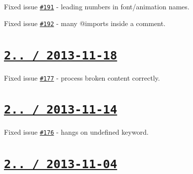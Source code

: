 \begin{DoxyItemize}
\item Fixed issue \href{https://github.com/jakubpawlowicz/clean-css/issues/191}{\tt \#191} -\/ leading numbers in {\ttfamily font}/{\ttfamily animation} names.
\item Fixed issue \href{https://github.com/jakubpawlowicz/clean-css/issues/192}{\tt \#192} -\/ many {\ttfamily @import}s inside a comment.
\end{DoxyItemize}

\section*{\href{https://github.com/jakubpawlowicz/clean-css/compare/v2.0.1...v2.0.2}{\tt 2.. / 2013-\/11-\/18} }


\begin{DoxyItemize}
\item Fixed issue \href{https://github.com/jakubpawlowicz/clean-css/issues/177}{\tt \#177} -\/ process broken content correctly.
\end{DoxyItemize}

\section*{\href{https://github.com/jakubpawlowicz/clean-css/compare/v2.0.0...v2.0.1}{\tt 2.. / 2013-\/11-\/14} }


\begin{DoxyItemize}
\item Fixed issue \href{https://github.com/jakubpawlowicz/clean-css/issues/176}{\tt \#176} -\/ hangs on {\ttfamily undefined} keyword.
\end{DoxyItemize}

\section*{\href{https://github.com/jakubpawlowicz/clean-css/compare/v1.1.7...v2.0.0}{\tt 2.. / 2013-\/11-\/04} }


